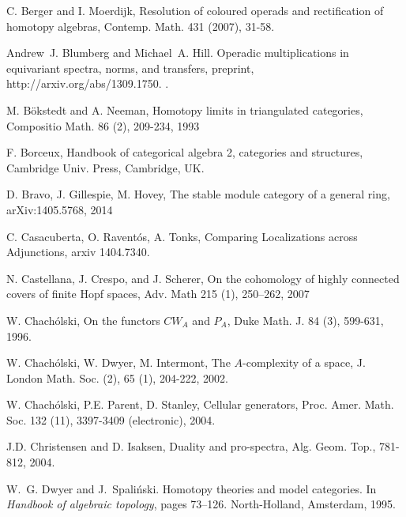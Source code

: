 \documentclass[11pt,reqno]{amsart}
\theoremstyle{definition}
\numberwithin{equation}{subsection}
\begin{document}
\begin{thebibliography}{AAAAAA}


C. Berger and I. Moerdijk, Resolution of coloured operads and rectification of homotopy algebras, Contemp. Math. 431 (2007), 31-58.



Andrew~J. Blumberg and Michael~A. Hill.
\newblock Operadic multiplications in equivariant spectra, norms, and
  transfers, preprint, http://arxiv.org/abs/1309.1750.
.

 M. B{\"o}kstedt and A. Neeman, Homotopy limits in triangulated categories, Compositio Math. 86 (2), 209-234, 1993


F. Borceux, Handbook of categorical algebra 2, categories and structures, Cambridge Univ. Press, Cambridge, UK.

 D. Bravo, J. Gillespie, M. Hovey, The stable module category of a general ring, arXiv:1405.5768, 2014

 C. Casacuberta, O. Ravent\'{o}s, A. Tonks, Comparing Localizations across Adjunctions, arxiv 1404.7340.

 N. Castellana, J. Crespo, and J. Scherer, On the cohomology of highly connected covers of finite {H}opf
              spaces, Adv. Math 215 (1), 250--262, 2007

W. Chach\'{o}lski, On the functors {$CW_A$} and {$P_A$}, Duke Math. J. 84 (3), 599-631, 1996.

W. Chach\'{o}lski, W. Dwyer, M. Intermont, The {$A$}-complexity of a space, J. London Math. Soc. (2), 65 (1), 204-222, 2002.

W. Chach\'{o}lski, P.E. Parent, D. Stanley, Cellular generators, Proc. Amer. Math. Soc. 132 (11), 3397-3409 (electronic), 2004.

J.D. Christensen and D. Isaksen, Duality and pro-spectra, Alg. Geom. Top., 781-812, 2004.

W.~G. Dwyer and J.~Spali{\'n}ski.
\newblock Homotopy theories and model categories.
\newblock In {\em Handbook of algebraic topology}, pages 73--126.
  North-Holland, Amsterdam, 1995.


\end{thebibliography}
\end{document}

